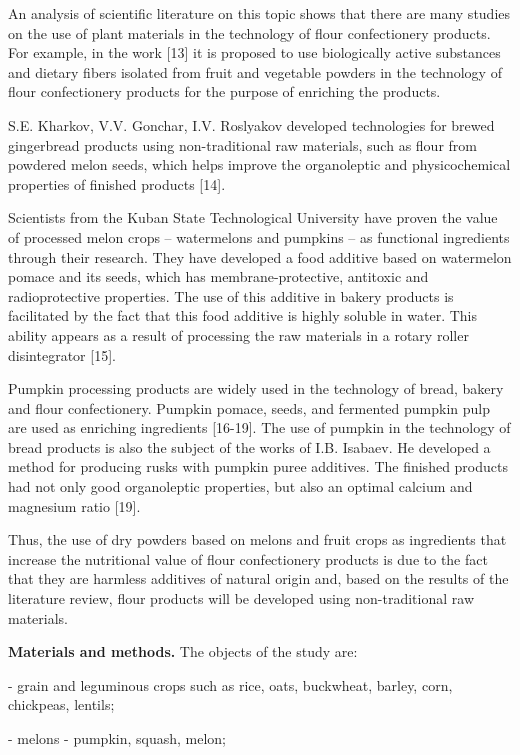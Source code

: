 \begin{multicols}{2}
An analysis of scientific literature on this topic shows that there are
many studies on the use of plant materials in the technology of flour
confectionery products. For example, in the work {[}13{]} it is proposed
to use biologically active substances and dietary fibers isolated from
fruit and vegetable powders in the technology of flour confectionery
products for the purpose of enriching the products.

S.E. Kharkov, V.V. Gonchar, I.V. Roslyakov developed technologies for
brewed gingerbread products using non-traditional raw materials, such as
flour from powdered melon seeds, which helps improve the organoleptic
and physicochemical properties of finished products {[}14{]}.

Scientists from the Kuban State Technological University have proven the
value of processed melon crops -- watermelons and pumpkins -- as
functional ingredients through their research. They have developed a
food additive based on watermelon pomace and its seeds, which has
membrane-protective, antitoxic and radioprotective properties. The use
of this additive in bakery products is facilitated by the fact that this
food additive is highly soluble in water. This ability appears as a
result of processing the raw materials in a rotary roller disintegrator
{[}15{]}.

Pumpkin processing products are widely used in the technology of bread,
bakery and flour confectionery. Pumpkin pomace, seeds, and fermented
pumpkin pulp are used as enriching ingredients {[}16-19{]}. The use of
pumpkin in the technology of bread products is also the subject of the
works of I.B. Isabaev. He developed a method for producing rusks with
pumpkin puree additives. The finished products had not only good
organoleptic properties, but also an optimal calcium and magnesium ratio
{[}19{]}.

Thus, the use of dry powders based on melons and fruit crops as
ingredients that increase the nutritional value of flour confectionery
products is due to the fact that they are harmless additives of natural
origin and, based on the results of the literature review, flour
products will be developed using non-traditional raw materials.

{\bfseries Materials and methods.} The objects of the study are:

- grain and leguminous crops such as rice, oats, buckwheat, barley,
corn, chickpeas, lentils;

- melons - pumpkin, squash, melon;


\end{multicols}
